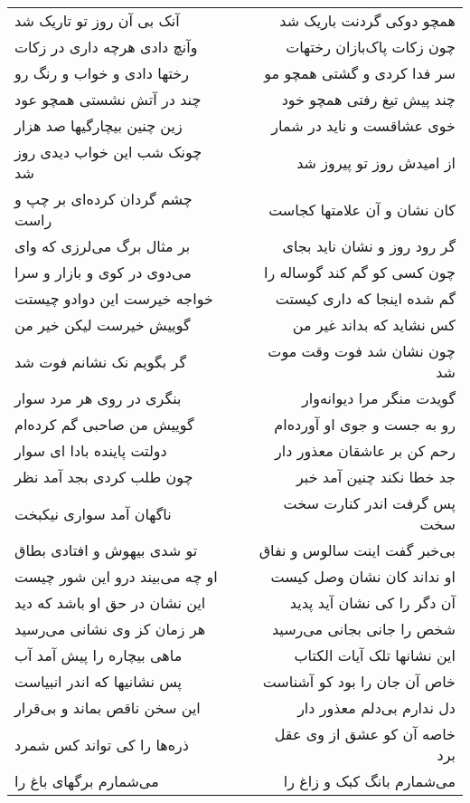 \begin{center}
\begin{longtable}{l p{0.5cm} r}
\\
آنک بی آن روز تو تاریک شد
&&
همچو دوکی گردنت باریک شد
\\
وآنچ دادی هرچه داری در زکات
&&
چون زکات پاک‌بازان رختهات
\\
رختها دادی و خواب و رنگ رو
&&
سر فدا کردی و گشتی همچو مو
\\
چند در آتش نشستی همچو عود
&&
چند پیش تیغ رفتی همچو خود
\\
زین چنین بیچارگیها صد هزار
&&
خوی عشاقست و ناید در شمار
\\
چونک شب این خواب دیدی روز شد
&&
از امیدش روز تو پیروز شد
\\
چشم گردان کرده‌ای بر چپ و راست
&&
کان نشان و آن علامتها کجاست
\\
بر مثال برگ می‌لرزی که وای
&&
گر رود روز و نشان ناید بجای
\\
می‌دوی در کوی و بازار و سرا
&&
چون کسی کو گم کند گوساله را
\\
خواجه خیرست این دوادو چیستت
&&
گم شده اینجا که داری کیستت
\\
گوییش خیرست لیکن خیر من
&&
کس نشاید که بداند غیر من
\\
گر بگویم نک نشانم فوت شد
&&
چون نشان شد فوت وقت موت شد
\\
بنگری در روی هر مرد سوار
&&
گویدت منگر مرا دیوانه‌وار
\\
گوییش من صاحبی گم کرده‌ام
&&
رو به جست و جوی او آورده‌ام
\\
دولتت پاینده بادا ای سوار
&&
رحم کن بر عاشقان معذور دار
\\
چون طلب کردی بجد آمد نظر
&&
جد خطا نکند چنین آمد خبر
\\
ناگهان آمد سواری نیکبخت
&&
پس گرفت اندر کنارت سخت سخت
\\
تو شدی بیهوش و افتادی بطاق
&&
بی‌خبر گفت اینت سالوس و نفاق
\\
او چه می‌بیند درو این شور چیست
&&
او نداند کان نشان وصل کیست
\\
این نشان در حق او باشد که دید
&&
آن دگر را کی نشان آید پدید
\\
هر زمان کز وی نشانی می‌رسید
&&
شخص را جانی بجانی می‌رسید
\\
ماهی بیچاره را پیش آمد آب
&&
این نشانها تلک آیات الکتاب
\\
پس نشانیها که اندر انبیاست
&&
خاص آن جان را بود کو آشناست
\\
این سخن ناقص بماند و بی‌قرار
&&
دل ندارم بی‌دلم معذور دار
\\
ذره‌ها را کی تواند کس شمرد
&&
خاصه آن کو عشق از وی عقل برد
\\
می‌شمارم برگهای باغ را
&&
می‌شمارم بانگ کبک و زاغ را
\\

\end{longtable}
\end{center}
